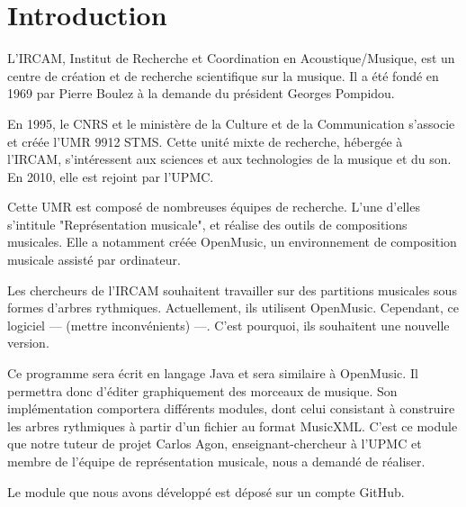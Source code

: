 \section{Introduction}


L'IRCAM, Institut de Recherche et Coordination en Acoustique/Musique, est un centre de création et de recherche scientifique sur la musique. Il a été fondé en 1969 par Pierre Boulez à la demande du président Georges Pompidou. 

\par
En 1995, le CNRS et le ministère de la Culture et de la Communication s'associe et créée l'UMR 9912 STMS. Cette unité mixte de recherche, hébergée à l'IRCAM, s'intéressent aux sciences et aux technologies de la musique et du son. En 2010, elle est rejoint par l'UPMC.

\par
Cette UMR est composé de nombreuses équipes de recherche. L'une d'elles s'intitule "Représentation musicale", et réalise des outils de compositions musicales. Elle a notamment créée OpenMusic, un environnement de composition musicale assisté par ordinateur.

\par
Les chercheurs de l'IRCAM souhaitent travailler sur des partitions musicales sous formes d'arbres rythmiques. Actuellement, ils utilisent OpenMusic. Cependant, ce logiciel --- (mettre inconvénients) ---. C'est pourquoi, ils souhaitent une nouvelle version. 

\par
Ce programme sera écrit en langage Java et sera similaire à OpenMusic. Il permettra donc d'éditer graphiquement des morceaux de musique. Son implémentation comportera différents modules, dont celui consistant à construire les arbres rythmiques à partir d'un fichier au format MusicXML. C'est ce module que notre tuteur de projet Carlos Agon, enseignant-chercheur à l'UPMC et membre de l'équipe de représentation musicale, nous a demandé de réaliser.

\par
Le module que nous avons développé est déposé sur un compte GitHub.
